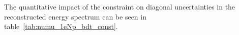 The quantitative impact of the constraint on diagonal uncertainties in the \npsel reconstructed energy spectrum can be seen in table~\ref{tab:numu_1eNp_bdt_const}.




